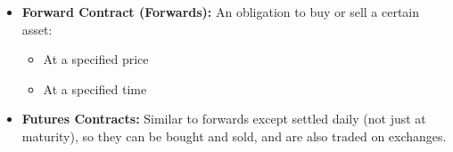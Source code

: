 \begin{terminology}
    \begin{itemize}
        \item \textbf{Forward Contract (Forwards):} An obligation to buy or sell a certain asset:
        \begin{itemize}
            \item At a specified price
            \item At a specified time
        \end{itemize}
        
        \item \textbf{Futures Contracts:} Similar to forwards except settled daily (not just at maturity), so they can be bought and sold, and are also traded on exchanges.
    \end{itemize}
\end{terminology}


